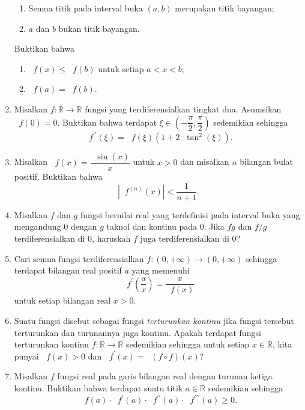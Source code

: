 \documentclass[12pt]{article}
\newcommand*\func[2]{\mathop{}\!{#1}{\left({#2}\right)}}
\begin{document}
\begin{enumerate}[leftmargin=*]
		\begin{enumerate}[label=$\bullet$]
			\item Semua titik pada interval buka $ \left(a, b\right) $ merupakan titik bayangan;
			\item $ a $ dan $ b $ bukan titik bayangan.
		\end{enumerate}
		Buktikan bahwa
		\begin{enumerate}
			\item $ \func{f}{x} \leq \func{f}{b} $ untuk setiap $ a < x < b $;
			\item $ \func{f}{a} = \func{f}{b} $.
		\end{enumerate}
		\item Misalkan $ f : \mathbb{R} \to \mathbb{R} $ fungsi yang terdiferensialkan tingkat dua. Asumsikan $ \func{f}{0} = 0 $. Buktikan bahwa terdapat $ \xi \in \left(-\dfrac{\pi}{2}, \dfrac{\pi}{2}\right) $ sedemikian sehingga
		\[ \func{f^{\prime\prime}}{\xi} = \func{f}{\xi}\left(1 + 2\func{\tan^{2}}{\xi}\right). \]
		\item Misalkan $ \func{f}{x} = \dfrac{\func{\sin}{x}}{x} $ untuk $ x > 0 $ dan misalkan $ n $ bilangan bulat positif. Buktikan bahwa
		\[ \left|\func{f^{\left(n\right)}}{x}\right| < \frac{1}{n + 1}. \]
		\item Misalkan $ f $ dan $ g $ fungsi bernilai real yang terdefinisi pada interval buka yang mengandung 0 dengan $ g $ taknol dan kontinu pada 0. Jika $ fg $ dan $ f/g $ terdiferensialkan di 0, haruskah $ f $ juga terdiferensialkan di 0?
		\item Cari semua fungsi terdiferensialkan $ f : \left(0, +\infty\right) \to \left(0, +\infty\right) $ sehingga terdapat bilangan real positif $ a $ yang memenuhi
		\[ \func{f^{\prime}}{\frac{a}{x}} = \frac{x}{\func{f}{x}} \]
		untuk setiap bilangan real $ x > 0 $.
		\item Suatu fungsi disebut sebagai fungsi \textit{terturunkan kontinu} jika fungsi tersebut terturunkan dan turunannya juga kontinu. Apakah terdapat fungsi terturunkan kontinu $ f : \mathbb{R} \to \mathbb{R} $ sedemikian sehingga untuk setiap $ x \in \mathbb{R} $, kita punyai $ \func{f}{x} > 0 $ dan $ \func{f^{\prime}}{x} = \func{\left(f \circ f\right)}{x} $?
		\item Misalkan $ f $ fungsi real pada garis bilangan real dengan turunan ketiga kontinu. Buktikan bahwa terdapat suatu titik $ a \in \mathbb{R} $ sedemikian sehingga
		\[ \func{f}{a} \cdot \func{f^{\prime}}{a} \cdot \func{f^{\prime\prime}}{a} \cdot \func{f^{\prime\prime\prime}}{a} \geq 0. \]

\end{enumerate}
\end{document}
